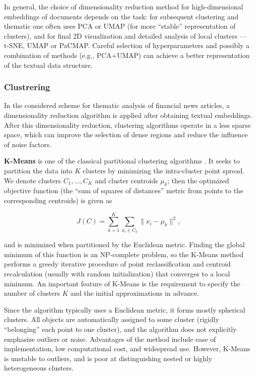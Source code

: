In general, the choice of dimensionality reduction method for high-dimensional embeddings of documents depends
on the task: for subsequent clustering and thematic one often uses PCA or UMAP (for more “stable” representation
of clusters), and for final 2D visualization and detailed analysis of local clusters --- t-SNE, UMAP or PaCMAP.
Careful selection of hyperparameters and possibly a combination of methods (e.g., PCA+UMAP) can achieve a better
representation of the textual data structure.

\subsubsection{Clustrering}
In the considered scheme for thematic analysis of financial news articles, a dimensionality
reduction algorithm is applied after obtaining textual embeddings. After this dimensionality
reduction, clustering algorithms operate in a less sparse space, which can improve
the selection of dense regions and reduce the influence of noise factors.

\textbf{K-Means} is one of the classical partitional clustering algorithms \parencite{kmeans2010data}.
It seeks to partition the data into $K$ clusters by minimizing the intra-cluster point spread.
We denote clusters $C_1,\dots,C_K$ and cluster centroids $\mu_k$; then the optimized objective
function (the “sum of squares of distances” metric from points to the corresponding centroids)
is given as

\begin{equation}
    J(C)= \sum_{k=1}^K \sum_{x_i \in C_k} \|x_i - \mu_k\|^2,
\end{equation}

and is minimized when partitioned by the Euclidean metric. Finding the global minimum of this
function is an NP-complete problem, so the K-Means method performs a greedy iterative procedure
of point reclassification and centroid recalculation (usually with random initialization) that
converges to a local minimum. An important feature of K-Means is the requirement to specify
the number of clusters $K$ and the initial approximations in advance.

Since the algorithm typically uses a Euclidean metric, it forms mostly spherical clusters. All
objects are automatically assigned to some cluster (rigidly “belonging” each point to one cluster),
and the algorithm does not explicitly emphasize outliers or noise. Advantages of the method include
ease of implementation, low computational cost, and widespread use. However, K-Means is unstable
to outliers, and is poor at distinguishing nested or highly heterogeneous clusters.

